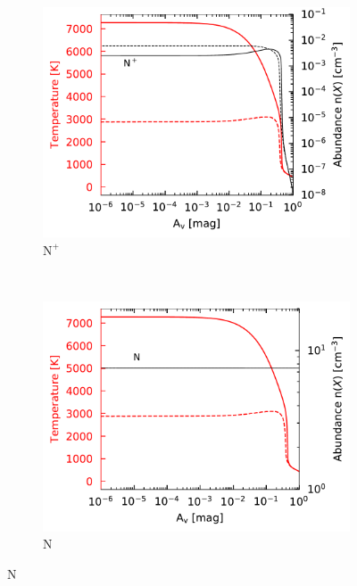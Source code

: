 \begin{figure}[!htbp]
    \centering
    \begin{subfigure}[t]{0.49\textwidth} %
        \centering \includegraphics[trim = {0 0 0 0},clip,width=1\textwidth]{figure/Cl/gridModelEmiss/nT_comp_Np.pdf}
        \caption{$\mathrm{N}^+$}
    \end{subfigure}
    ~ 
   \begin{subfigure}[t]{0.49\textwidth} %
        \centering \includegraphics[trim = {0 0 0 0},clip,width=1\textwidth]{figure/Cl/gridModelEmiss/nT_comp_N.pdf}
        \caption{$\mathrm{N}$}
    \end{subfigure}
    

\end{figure}
